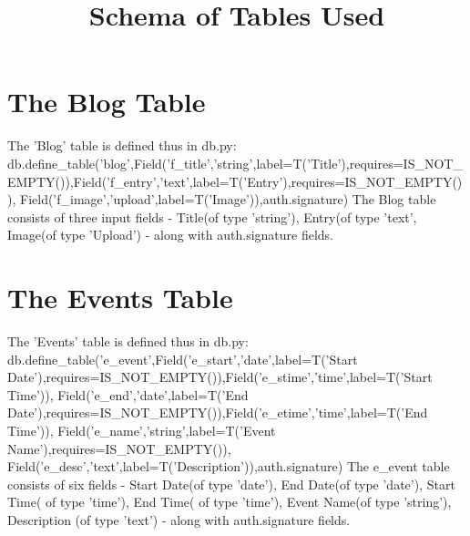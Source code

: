 \documentclass[11pt]{article}
\title{\textbf{Schema of Tables Used}}
\author{}
\date{}
\begin{document}
\maketitle

\section{The Blog Table}

The 'Blog' table is defined thus in db.py: \newline \newline db.define\_table('blog',Field('f\_title','string',label=T('Title'),requires=IS\_NOT\_EMPTY()),Field('f\_entry','text',label=T('Entry'),requires=IS\_NOT\_EMPTY()), Field('f\_image','upload',label=T('Image')),auth.signature)
\newline \newline
The Blog table consists of three input fields - Title(of type 'string'), Entry(of type 'text', Image(of type 'Upload') - along with auth.signature fields. 

\section{The Events Table}
The 'Events' table is defined thus in db.py: \newline \newline db.define\_table('e\_event',Field('e\_start','date',label=T('Start Date'),requires=IS\_NOT\_EMPTY()),Field('e\_stime','time',label=T('Start Time')), Field('e\_end','date',label=T('End Date'),requires=IS\_NOT\_EMPTY()),Field('e\_etime','time',label=T('End Time')), Field('e\_name','string',label=T('Event Name'),requires=IS\_NOT\_EMPTY()), Field('e\_desc','text',label=T('Description')),auth.signature)
\newline \newline
The e\_event table consists of six fields - Start Date(of type 'date'), End Date(of type 'date'), Start Time( of type 'time'), End Time( of type 'time'), Event Name(of type 'string'), Description (of type 'text') - along with auth.signature fields. 
\end{document}

